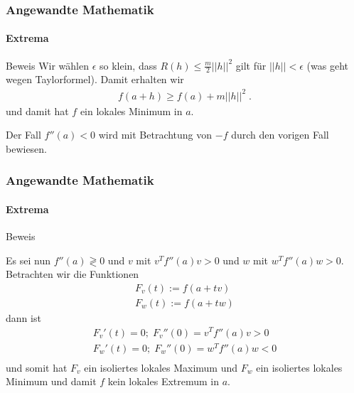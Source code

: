 \documentclass{beamer}
\begin{document}
\begin{frame}
    \frametitle{Angewandte Mathematik}
\framesubtitle{Extrema}
    \begin{block}{Beweis}
Wir wählen $\epsilon$ so klein, dass $R(h) \leq \frac{m}{2}  ||h||^2$ gilt für $||h|| < \epsilon$  (was geht wegen Taylorformel).
Damit erhalten wir
\begin{align*}
f(a + h) \geq f(a) +  m ||h||^2 \;.
\end{align*}
und damit hat $f$ ein lokales Minimum in $a$.

Der Fall $f''(a) < 0$ wird mit Betrachtung von $-f$ durch den vorigen Fall bewiesen.
\end{block}
 \end{frame}



\begin{frame}
    \frametitle{Angewandte Mathematik}
\framesubtitle{Extrema}
    \begin{block}{Beweis}


Es sei nun $f''(a) \gtrless 0$ und $v$ mit $v^T f''(a) v > 0$ und $w$ mit $w^T f''(a) w > 0$. Betrachten wir die Funktionen
\begin{align*}
F_v (t) := f(a + tv) \\
F_w(t) := f(a +tw)
\end{align*}
dann ist 
\begin{align*}
F_v' (t) = 0; \; F_v''(0) = v^T f''(a) v > 0 \\
F_w' (t) = 0; \; F_w''(0) = w^T f''(a) w < 0 \\
\end{align*}
und somit hat $F_v$ ein isoliertes lokales Maximum und $F_w$ ein isoliertes lokales Minimum und damit $f$ kein lokales Extremum  in  $a$.
\end{block}
 \end{frame}
\end{document}
